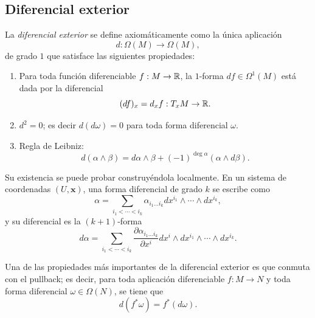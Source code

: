 \documentclass[11pt,a4paper]{amsbook}
\theoremstyle{remark} \newtheorem{rmk}[subsection]{Observación}
\theoremstyle{definition} \newtheorem{defn}[subsection]{Definición}
\theoremstyle{definition} \newtheorem{ex}[subsection]{Ejemplo}
\theoremstyle{definition} \newtheorem{ej}[subsection]{Ejercicio}
\begin{document}
\subsection{Diferencial exterior} La \emph{diferencial exterior} se define axiomáticamente como la única aplicación
\begin{equation*}
d: \Omega(M) \rightarrow \Omega(M),
\end{equation*}
de grado $1$ que satisface las siguientes propiedades:
\begin{enumerate}
  \item Para toda función diferenciable $f:M\rightarrow \mathbb R$, la $1$-forma $d f\in \Omega^1(M)$ está dada por la diferencial
        \begin{equation*}
(d f)_x = d_xf: T_xM \rightarrow \mathbb R.
        \end{equation*}
 \item $d^2=0$; es decir $d(d\omega)=0$ para toda forma diferencial $\omega$.
  \item Regla de Leibniz:
        \begin{equation*}
d(\alpha \wedge \beta) = d\alpha \wedge \beta + (-1)^{\deg \alpha}(\alpha \wedge d\beta).
        \end{equation*}
\end{enumerate}

Su existencia se puede probar construyéndola localmente. En un sistema de coordenadas $(U,\bm{x})$, una forma diferencial de grado $k$ se escribe como
\begin{equation*}
\alpha = \sum_{i_1<\cdots < i_k} \alpha_{i_1\dots i_k} dx^{i_1}\wedge \cdots \wedge dx^{i_k},
\end{equation*}
y su diferencial es la $(k+1)$-forma
\begin{equation*}
d\alpha = \sum_{i_1< \cdots < i_k} \frac{\partial \alpha_{i_1 \dots i_k}}{\partial x^i} dx^i \wedge dx^{i_1} \wedge \cdots \wedge dx^{i_k}.
\end{equation*}

Una de las propiedades más importantes de la diferencial exterior es que conmuta con el pullback; es decir, para toda aplicación diferenciable $f:M\rightarrow N$ y toda forma diferencial $\omega \in \Omega(N)$, se tiene que
\begin{equation*}
d(f^* \omega) = f^* (d\omega).
\end{equation*}
\end{document}
